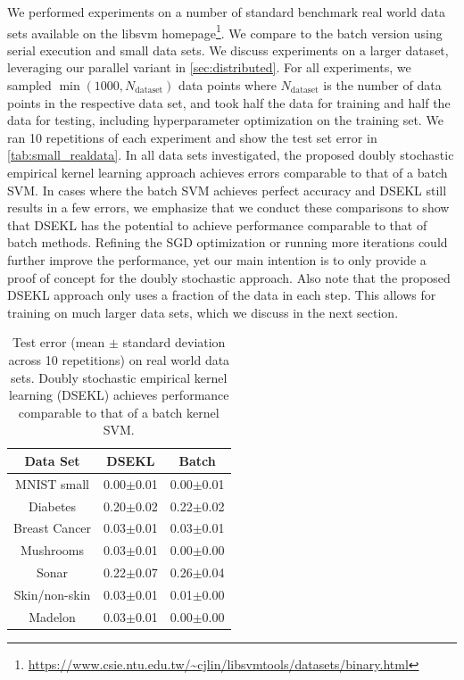 \documentclass{article} %
\begin{document}
We performed experiments on a number of standard benchmark real world data sets available on the libsvm homepage\footnote{\url{https://www.csie.ntu.edu.tw/~cjlin/libsvmtools/datasets/binary.html}}. We compare to the batch version using serial execution and small data sets. We discuss experiments on a larger dataset, leveraging our parallel variant in \autoref{sec:distributed}. For all experiments, we sampled $\min(1000,N_{\text{dataset}})$ data points where $N_{\text{dataset}}$ is the number of data points in the respective data set, and took half the data for training and half the data for testing, including hyperparameter optimization on the training set. We ran 10 repetitions of each experiment and show the test set error in \autoref{tab:small_realdata}. In all data sets  investigated, the proposed doubly stochastic empirical kernel learning approach achieves errors comparable to that of a batch SVM. In cases where the batch SVM achieves perfect accuracy and DSEKL still results in a few errors, we emphasize that we conduct these comparisons to show that DSEKL has the potential to achieve performance comparable to that of batch methods. Refining the SGD optimization or running more iterations could further improve the performance, yet our main intention is to only provide a proof of concept for the doubly stochastic approach. Also note that the proposed DSEKL approach only uses a fraction of the data in each step. This allows for training on much larger data sets, which we discuss in the next section.
%
\begin{table}
\footnotesize
\begin{center}
\begin{tabular}{ ccc } 
Data Set & DSEKL & Batch\\
 \hline
MNIST small & 0.00$\pm$0.01  & 0.00$\pm$0.01\\
Diabetes & 0.20$\pm$0.02  & 0.22$\pm$0.02\\
Breast Cancer &  0.03$\pm$0.01 & 0.03$\pm$0.01\\
Mushrooms & 0.03$\pm$0.01 & 0.00$\pm$0.00\\
Sonar & 0.22$\pm$0.07 & 0.26$\pm$0.04\\
Skin/non-skin & 0.03$\pm$0.01 &  0.01$\pm$0.00\\
Madelon & 0.03$\pm$0.01 &  0.00$\pm$0.00\\
 \hline
\end{tabular}
\caption{\footnotesize Test error (mean $\pm$ standard deviation across 10 repetitions) on real world data sets. Doubly stochastic empirical kernel learning (DSEKL) achieves performance comparable to that of a batch kernel SVM. \label{tab:small_realdata}}
\end{center}
\end{table}
%
\end{document}
